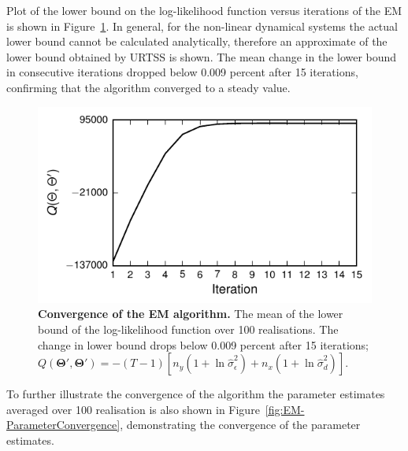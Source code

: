 \documentclass[]{article}
\begin{document}
Plot of the lower bound on the log-likelihood function versus iterations of the EM is shown in Figure~\ref{fig:LowerBound}. In general, for the non-linear dynamical systems the actual lower bound cannot be calculated analytically, therefore an approximate of the lower bound obtained by URTSS is shown. The mean change in the lower bound in consecutive iterations dropped below 0.009 percent after 15 iterations, confirming
that the algorithm converged to a steady value.
\begin{figure}[!ht]
\centering
\includegraphics{./Figures/Q.pdf}
\caption{{\bf Convergence of the EM algorithm.} The mean of the lower bound of the log-likelihood function over 100 realisations. The change in lower bound drops below 0.009 percent after 15 iterations; \small{$Q(\boldsymbol\Theta',\boldsymbol\Theta')=-(T-1)\left[n_y(1+\ln \hat{\sigma}^2_{\epsilon})+ n_x(1+\ln \hat{\sigma}^2_d)\right]$}.}
\label{fig:LowerBound}
\end{figure}
To further illustrate the convergence of the algorithm the parameter estimates averaged over 100 realisation is also shown in Figure~\ref{fig:EM-ParameterConvergence}, demonstrating the convergence of the parameter estimates.
\end{document}

